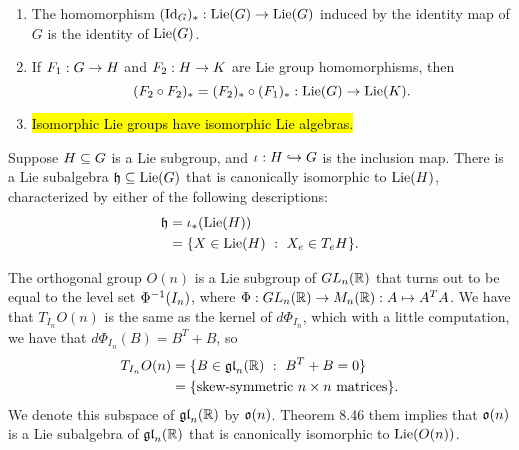 \begin{prop}\nl
\begin{enumerate}
    \item The homomorphism $(\text{Id}_G)_*:\text{Lie}(G)\rightarrow \text{Lie}(G)$ induced by the identity map of $G$ is the identity of $\text{Lie}(G)$.
    \item If $F_1:G\rightarrow H$ and $F_2:H\rightarrow K$ are Lie group homomorphisms, then
    \[(F_2\circ F_2)_* = (F_2)_*\circ (F_1)_*:\text{Lie}(G)\rightarrow \text{Lie}(K).\]
    \item \hl{Isomorphic Lie groups have isomorphic Lie algebras.}
\end{enumerate}
\end{prop}

\begin{thm}
Suppose $H\subseteq G$ is a Lie subgroup, and $\iota:H\hookrightarrow G$ is the inclusion map. There is a Lie subalgebra $\mathfrak{h}\subseteq\text{Lie}(G)$ that is canonically isomorphic to $\text{Lie}(H)$, characterized by either of the following descriptions:
\begin{align*}
    \mathfrak{h} &= \iota_*(\text{Lie}(H))\\
    &= \{X\in \text{Lie}(H)\ :\ X_e\in T_eH\}.
\end{align*}
\end{thm}

\begin{ex}
The orthogonal group $O(n)$ is a Lie subgroup of $GL_n(\mathbb{R})$ that turns out to be equal to the level set $\Phi^{-1}(I_n)$, where $\Phi:GL_n(\mathbb{R})\rightarrow M_n(\mathbb{R}):A\mapsto A^T A$. We have that $T_{I_n}O(n)$ is the same as the kernel of $d\Phi_{I_n}$, which with a little computation, we have that $d\Phi_{I_n}(B) = B^T + B$, so 
\begin{align*}
    T_{I_n}O(n) &= \{B\in \mathfrak{gl}_n(\mathbb{R})\ :\ B^T + B = 0\}\\
    &= \{\text{skew-symmetric $n\times n$ matrices}\}.
\end{align*}
We denote this subspace of $\mathfrak{gl}_n(\mathbb{R})$ by $\mathfrak{o}(n)$. Theorem 8.46 them implies that $\mathfrak{o}(n)$ is a Lie subalgebra of $\mathfrak{gl}_n(\mathbb{R})$ that is canonically isomorphic to $\text{Lie}(O(n))$.
\end{ex}


